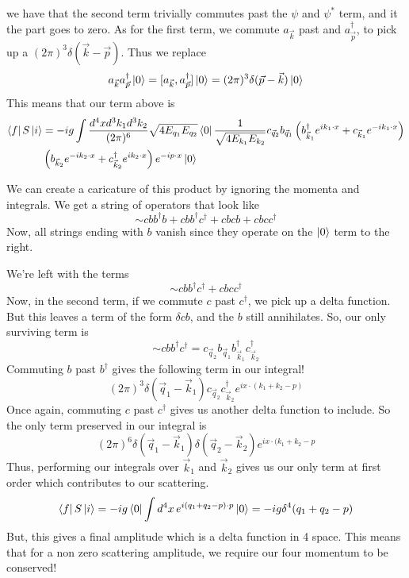 \documentclass[11pt, oneside]{article}   	%
\theoremstyle{newline}
\theoremstyle{newline}
\theoremstyle{newline}
\theoremstyle{newline}
\theoremstyle{newline}
\begin{document}
we have that the second term trivially commutes past the $ \psi $ and $ \psi ^ * $ term, and it 
the part goes to zero. As for the first term, 
we commute $ a_{ \vec{k} } $ past and $ a_{ \vec{p} }^ \dagger $, to pick up 
a $ ( 2 \pi ) ^ 3 \delta ( \vec{k} - \vec{p} ) $. 
Thus we replace 
\[
a_{ \vec{k} } a_{ \vec{p}  }^\dagger \ket{ 0 } = [ a_{ \vec{k} }, a_{ \vec{p} } ^ \dagger ] \ket{ 0 }  = ( 2 \pi ) ^ 3 \delta ( \vec{p}  - \vec{k} ) \ket{ 0 }  
\] This means that our term above is 
\begin{align*}
\bra{ f} S \ket{ i } &= - ig \int \frac{ d^ 4 x d^  3 k_1 d^ 3 k_ 2  }{ ( 2 \pi ) ^ 6} \sqrt{ 4 E_{ q_1 } E_{ q_2 }} \bra{ 0 }\frac{1}{ \sqrt{ 4 E_{ k_1 } E_{ k_2 } }} c_{ \vec{q}_2 } b_{ \vec{q}_1 } \left(  b_{\vec{k}_ 1 } ^ \dagger e^{ i k_1 \cdot  x } + c_{ \vec{k}_1 } e^{  - i k_1 \cdot  x } \right) \\
& \left( b_{ \vec{k}_ 2  } e^{ - i k_2 \cdot  x  } + c_{\vec{k}_ 2 }^\dagger e^{ i k_2 \cdot  x } \right) e^{ - i p \cdot  x } \ket{ 0 }  
\end{align*}

We can create a caricature of this product by ignoring the 
momenta and integrals. We get a string of operators 
that look like 
\[
\sim c b b ^\dagger b + c b b ^\dagger c^ \dagger + c  b c b + c b c c^\dagger 
\] Now, all strings ending with $ b $ vanish since they 
operate on the $ \ket{ 0 } $ term to the right. 

We're left with the terms 
\[
\sim c b b ^ \dagger c ^ \dagger + c b c c^ \dagger 
\] Now, in the second term, if we commute $ c $ past  $ c ^ \dagger$, 
we pick up a delta function. But this leaves a term of the form  $ \delta c b $, 
and the  $b  $ still annihilates. So, our only surviving term is 
\[
\sim c b b ^ \dagger c ^ \dagger = c_{ \vec{q} _ 2 } b_{ \vec{q}_ 1 }b_{ \vec{k} _ 1}^\dagger c_{ \vec{k} _ 2 }^\dagger  
\] Commuting $ b $ past $ b^ \dagger$ gives the following term in our integral!
\[
( 2 \pi ) ^ 3 \delta ( \vec{q}_ 1 - \vec{k}_ 1 ) c_{ \vec{q}_ 2 } c_{ \vec{k} _ 2 } ^ \dagger e^{ i x\cdot   ( k_1 + k_2 - p)  }
\] Once again, commuting $ c $ past $ c ^ \dagger $ gives us another delta function to include. 
So the only term preserved in our integral is 
\[
( 2 \pi ) ^ 6  \delta ( \vec{q}_ 1 - \vec{k}_ 1 ) \delta( \vec{q}_ 2 - \vec{k}_ 2 )  e^{ i x\cdot   ( k_1 + k_2 - p }
\] Thus, performing our integrals over $ \vec{k}_ 1 $ and $ \vec{k}_ 2 $ gives us our only term 
at first order which contributes to our scattering. 
\[
\bra{ f} S \ket{ i } =  - i g \bra{ 0 } \int d^ 4 x \, e^{ i ( q_1 + q_2 - p ) \cdot  p } \ket{ 0 }  = - ig \delta ^ 4 ( q_ 1 + q_ 2 - p ) 
\] But, this gives a final amplitude which is a delta function in 4 space. 
This means that for a non zero scattering amplitude, we require our four momentum to be conserved!
\end{document}
